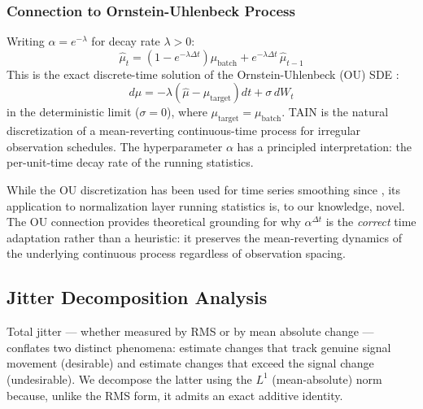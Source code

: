 \documentclass[11pt,a4paper]{article}
\begin{document}
\subsubsection{Connection to Ornstein-Uhlenbeck Process}

Writing $\alpha = e^{-\lambda}$ for decay rate $\lambda > 0$:
\begin{equation}
  \hat{\mu}_t = \left(1 - e^{-\lambda\Delta t}\right)\mu_\text{batch}
    + e^{-\lambda\Delta t}\,\hat{\mu}_{t-1}
\end{equation}
This is the exact discrete-time solution of the Ornstein-Uhlenbeck (OU) SDE
\citep{uhlenbeck1930theory}:
\begin{equation}
  d\hat{\mu} = -\lambda\left(\hat{\mu} - \mu_\text{target}\right)dt + \sigma\,dW_t
\end{equation}
in the deterministic limit ($\sigma = 0$), where $\mu_\text{target} = \mu_\text{batch}$.
TAIN is the natural discretization of a mean-reverting continuous-time process for
irregular observation schedules. The hyperparameter $\alpha$ has a principled
interpretation: the per-unit-time decay rate of the running statistics.

While the OU discretization has been used for time series smoothing since
\citet{wright1986}, its application to normalization layer running statistics is,
to our knowledge, novel. The OU connection provides theoretical grounding for why
$\alpha^{\Delta t}$ is the \emph{correct} time adaptation rather than a heuristic:
it preserves the mean-reverting dynamics of the underlying continuous process
regardless of observation spacing.

\subsection{Jitter Decomposition Analysis}
\label{sec:jitter-framework}

Total jitter --- whether measured by RMS or by mean absolute change --- conflates
two distinct phenomena: estimate changes that track genuine signal movement
(desirable) and estimate changes that exceed the signal change (undesirable). We
decompose the latter using the $L^1$ (mean-absolute) norm because, unlike the
RMS form, it admits an exact additive identity.
\end{document}

